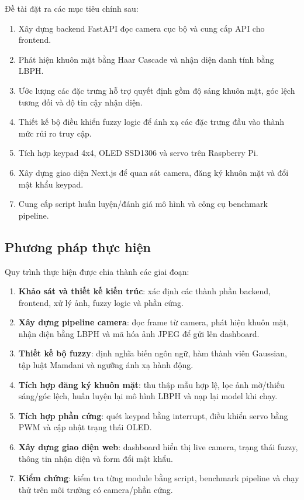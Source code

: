 Đề tài đặt ra các mục tiêu chính sau:

\begin{enumerate}
    \item Xây dựng backend FastAPI đọc camera cục bộ và cung cấp API cho frontend.
    \item Phát hiện khuôn mặt bằng Haar Cascade và nhận diện danh tính bằng LBPH.
    \item Ước lượng các đặc trưng hỗ trợ quyết định gồm độ sáng khuôn mặt, góc lệch tương đối và độ tin cậy nhận diện.
    \item Thiết kế bộ điều khiển fuzzy logic để ánh xạ các đặc trưng đầu vào thành mức rủi ro truy cập.
    \item Tích hợp keypad 4x4, OLED SSD1306 và servo trên Raspberry Pi.
    \item Xây dựng giao diện Next.js để quan sát camera, đăng ký khuôn mặt và đổi mật khẩu keypad.
    \item Cung cấp script huấn luyện/đánh giá mô hình và công cụ benchmark pipeline.
\end{enumerate}

\subsection{Phương pháp thực hiện}

Quy trình thực hiện được chia thành các giai đoạn:

\begin{enumerate}
    \item \textbf{Khảo sát và thiết kế kiến trúc}: xác định các thành phần backend, frontend, xử lý ảnh, fuzzy logic và phần cứng.
    \item \textbf{Xây dựng pipeline camera}: đọc frame từ camera, phát hiện khuôn mặt, nhận diện bằng LBPH và mã hóa ảnh JPEG để gửi lên dashboard.
    \item \textbf{Thiết kế bộ fuzzy}: định nghĩa biến ngôn ngữ, hàm thành viên Gaussian, tập luật Mamdani và ngưỡng ánh xạ hành động.
    \item \textbf{Tích hợp đăng ký khuôn mặt}: thu thập mẫu hợp lệ, lọc ảnh mờ/thiếu sáng/góc lệch, huấn luyện lại mô hình LBPH và nạp lại model khi chạy.
    \item \textbf{Tích hợp phần cứng}: quét keypad bằng interrupt, điều khiển servo bằng PWM và cập nhật trạng thái OLED.
    \item \textbf{Xây dựng giao diện web}: dashboard hiển thị live camera, trạng thái fuzzy, thông tin nhận diện và form đổi mật khẩu.
    \item \textbf{Kiểm chứng}: kiểm tra từng module bằng script, benchmark pipeline và chạy thử trên môi trường có camera/phần cứng.
\end{enumerate}

